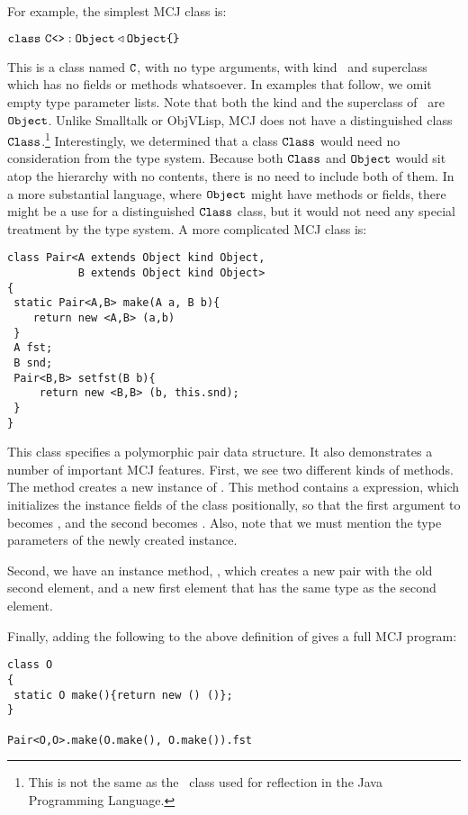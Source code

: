 \documentclass[10pt]{acm-sigplan}
\begin{document}
For example, the simplest MCJ class is:

\vspace{.1cm}
$\mathtt{{class}}\ {\mathtt{{C}}}\mbox{\tt <}\mbox{\tt >} : \mbox{\tt Object} \triangleleft \mbox{\tt Object} \mbox{\tt \{}\mbox{\tt \}}$
\vspace{.1cm}

This is a class named $\mathtt{{C}}$, with no type arguments, with kind \Object\
and superclass \Object\, which has no fields or methods whatsoever.
In examples that follow, we omit empty type parameter lists.  Note
that both the kind and the superclass of \C\ are $\mbox{\tt Object}$.  Unlike
Smalltalk or ObjVLisp, MCJ does not have a distinguished class
$\mbox{\tt Class}$.\footnote{This is not the same as the \Class\ class used for
  reflection in the Java Programming Language.}  Interestingly, we
determined that a class $\mbox{\tt Class}$ would need no consideration from the
type system.  Because both $\mbox{\tt Class}$ and $\mbox{\tt Object}$ would sit atop the
hierarchy with no contents, there is no need to include both of them.
In a more substantial language, where $\mbox{\tt Object}$ might have methods or
fields, there might be a use for a distinguished $\mbox{\tt Class}$ class, but
it would not need any special treatment by the type system.
\newpage
A more complicated MCJ class is:

\begin{verbatim}
class Pair<A extends Object kind Object,
           B extends Object kind Object>
{
 static Pair<A,B> make(A a, B b){ 
    return new <A,B> (a,b) 
 } 
 A fst;
 B snd;
 Pair<B,B> setfst(B b){
     return new <B,B> (b, this.snd);
 }
}
\end{verbatim}

This class specifies a polymorphic pair data structure.  It also
demonstrates a number of important MCJ features.  First, we see two
different kinds of methods.  The {\txt{make}} method creates a new
instance of {\txt{Pair}}.  This method contains a {\txt{new}}
expression, which initializes the instance fields of the class
positionally, so that the first argument to {} becomes
{\txt{fst}}, and the second becomes {\txt{snd}}.  Also, note that we
must mention the type parameters of the newly created instance.

Second, we have an instance method, {}, which creates a new
pair with the old second element, and a new first element that has
the same type as the second element.

Finally, adding the following to the above definition of {}
gives a full MCJ program:

\begin{verbatim}
class O
{
 static O make(){return new () ()};
}

Pair<O,O>.make(O.make(), O.make()).fst
\end{verbatim}
\end{document}
